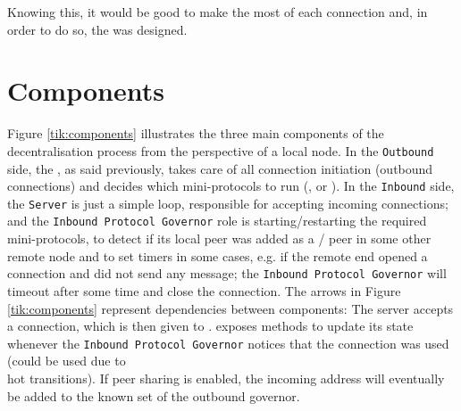 Knowing this, it would be good to make the most of each connection and, in order to do so, the
\Connmngr{} was designed.

\section{Components}
Figure \ref{tik:components} illustrates the three main components of the decentralisation
process from the perspective of a local node. In the \texttt{Outbound} side, the
\ptopgov{}, as said previously, takes care of all connection initiation (outbound
connections) and decides which mini-protocols to run (\established{}, \warm{} or \hot{}).
In the \texttt{Inbound} side, the \texttt{Server} is just a simple loop, responsible for accepting incoming
connections; and the \texttt{Inbound Protocol Governor} role is starting/restarting the required
mini-protocols, to detect if its local peer was added as a \warm{}/\hot{}
peer in some other remote node and to set timers in some cases, e.g. if the
remote end opened a connection and did not send any message; the
\texttt{Inbound Protocol Governor} will timeout after some time and close the
connection. The arrows in Figure \ref{tik:components} represent dependencies
between components: The server accepts a connection, which is then given to
\Connmngr{}. \Connmngr{} exposes methods to update its state whenever the
\texttt{Inbound Protocol Governor} notices that the connection was used (could
be used due to \warm{}\\hot{} transitions).  If peer sharing is enabled, the
incoming address will eventually be added to the known set of the outbound
governor.

